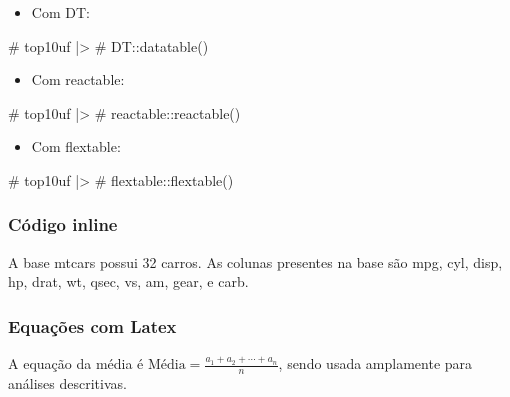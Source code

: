 \documentclass[
  letterpaper,
  DIV=11,
  numbers=noendperiod]{scrartcl}
\newenvironment{Shaded}{\begin{snugshade}}{\end{snugshade}}
\newcommand{\CommentTok}[1]{\textcolor[rgb]{0.37,0.37,0.37}{#1}}
\providecommand{\tightlist}{%
  \setlength{\itemsep}{0pt}\setlength{\parskip}{0pt}}\usepackage{longtable,booktabs,array}
\begin{document}
\begin{itemize}
\tightlist
\item
  Com DT:
\end{itemize}

\begin{Shaded}
\begin{Highlighting}[]
\CommentTok{\# top10uf |\textgreater{} }
\CommentTok{\#   DT::datatable()}
\end{Highlighting}
\end{Shaded}

\begin{itemize}
\tightlist
\item
  Com reactable:
\end{itemize}

\begin{Shaded}
\begin{Highlighting}[]
\CommentTok{\# top10uf |\textgreater{} }
\CommentTok{\#   reactable::reactable()}
\end{Highlighting}
\end{Shaded}

\begin{itemize}
\tightlist
\item
  Com flextable:
\end{itemize}

\begin{Shaded}
\begin{Highlighting}[]
\CommentTok{\# top10uf |\textgreater{} }
\CommentTok{\#   flextable::flextable()}
\end{Highlighting}
\end{Shaded}

\hypertarget{cuxf3digo-inline}{%
\subsubsection{Código inline}\label{cuxf3digo-inline}}

A base mtcars possui 32 carros. As colunas presentes na base são mpg,
cyl, disp, hp, drat, wt, qsec, vs, am, gear, e carb.

\hypertarget{equauxe7uxf5es-com-latex}{%
\subsubsection{Equações com Latex}\label{equauxe7uxf5es-com-latex}}

A equação da média é
\({\text{Média}=\frac {a_{1}+a_{2}+\cdots +a_{n}}{n}}\), sendo usada
amplamente para análises descritivas.
\end{document}
